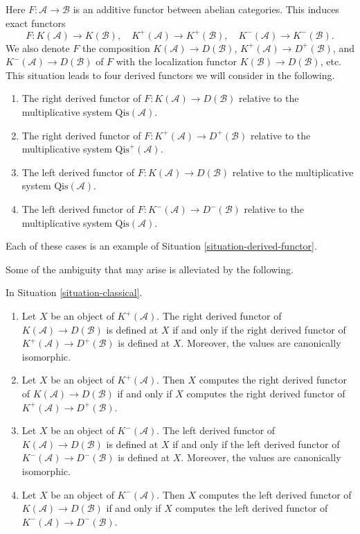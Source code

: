 \begin{situation}
\label{situation-classical}
Here $F : \mathcal{A} \to \mathcal{B}$ is an additive functor between
abelian categories. This induces exact functors
$$
F : K(\mathcal{A}) \to K(\mathcal{B}), \quad
K^{+}(\mathcal{A}) \to K^{+}(\mathcal{B}), \quad
K^{-}(\mathcal{A}) \to K^{-}(\mathcal{B}).
$$
We also denote $F$ the composition $K(\mathcal{A}) \to D(\mathcal{B})$,
$K^{+}(\mathcal{A}) \to D^{+}(\mathcal{B})$, and
$K^{-}(\mathcal{A}) \to D(\mathcal{B})$ of $F$ with the localization
functor $K(\mathcal{B}) \to D(\mathcal{B})$, etc. This situation leads
to four derived functors we will consider in the following.
\begin{enumerate}
\item The right derived functor of
$F : K(\mathcal{A}) \to D(\mathcal{B})$
relative to the multiplicative system $\text{Qis}(\mathcal{A})$.
\item The right derived functor of
$F : K^{+}(\mathcal{A}) \to D^{+}(\mathcal{B})$
relative to the multiplicative system $\text{Qis}^{+}(\mathcal{A})$.
\item The left derived functor of
$F : K(\mathcal{A}) \to D(\mathcal{B})$
relative to the multiplicative system $\text{Qis}(\mathcal{A})$.
\item The left derived functor of
$F : K^{-}(\mathcal{A}) \to D^{-}(\mathcal{B})$
relative to the multiplicative system $\text{Qis}(\mathcal{A})$.
\end{enumerate}
Each of these cases is an example of
Situation \ref{situation-derived-functor}.
\end{situation}

\noindent
Some of the ambiguity that may arise is alleviated by the following.

\begin{lemma}
\label{lemma-irrelevant}
In
Situation \ref{situation-classical}.
\begin{enumerate}
\item Let $X$ be an object of $K^{+}(\mathcal{A})$.
The right derived functor of $K(\mathcal{A}) \to D(\mathcal{B})$
is defined at $X$ if and only if the right derived functor of
$K^{+}(\mathcal{A}) \to D^{+}(\mathcal{B})$ is defined at $X$.
Moreover, the values are canonically isomorphic.
\item Let $X$ be an object of $K^{+}(\mathcal{A})$.
Then $X$ computes the right derived functor of
$K(\mathcal{A}) \to D(\mathcal{B})$
if and only if $X$ computes the right derived functor of
$K^{+}(\mathcal{A}) \to D^{+}(\mathcal{B})$.
\item Let $X$ be an object of $K^{-}(\mathcal{A})$.
The left derived functor of $K(\mathcal{A}) \to D(\mathcal{B})$
is defined at $X$ if and only if the left derived functor of
$K^{-}(\mathcal{A}) \to D^{-}(\mathcal{B})$ is defined at $X$.
Moreover, the values are canonically isomorphic.
\item Let $X$ be an object of $K^{-}(\mathcal{A})$.
Then $X$ computes the left derived functor of
$K(\mathcal{A}) \to D(\mathcal{B})$ if and only if $X$ computes
the left derived functor of $K^{-}(\mathcal{A}) \to D^{-}(\mathcal{B})$.
\end{enumerate}
\end{lemma}

